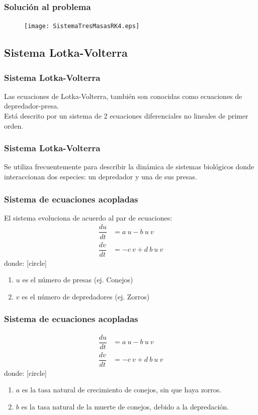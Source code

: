 \begin{frame}[plain]
\frametitle{Solución al problema}
\begin{figure}
    \centering
    \texttt{[image: SistemaTresMasasRK4.eps]} 
\end{figure}
\end{frame}
\subsection{Sistema Lotka-Volterra}
\begin{frame}
\frametitle{Sistema Lotka-Volterra}
Las ecuaciones de Lotka-Volterra, también son conocidas como ecuaciones de depredador-presa.
\\
\bigskip
Está descrito por un sistema de 2 ecuaciones diferenciales no lineales de primer orden.
\end{frame}
\begin{frame}
\frametitle{Sistema Lotka-Volterra}
Se utiliza frecuentemente para describir la dinámica de sistemas biológicos donde interaccionan dos especies: un depredador y una de sus presas.
\end{frame}
\begin{frame}
\frametitle{Sistema de ecuaciones acopladas}
El sistema evoluciona de acuerdo al par de ecuaciones:
\begin{align*}
\dfrac{du}{dt} &= a \: u - b \: u \: v \\
\dfrac{dv}{dt} &= -c \: v + d \: b\: u\: v
\end{align*}
donde:  
[circle]
\begin{enumerate}[<+->]
\item $u$ es el número de presas (ej. Conejos)
\item $v$ es el número de depredadores (ej. Zorros)
\seti
\end{enumerate}
\end{frame}
\begin{frame}
\frametitle{Sistema de ecuaciones acopladas}
\begin{align*}
\dfrac{du}{dt} &= a \: u - b \: u \: v \\
\dfrac{dv}{dt} &= -c \: v + d \: b\: u\: v
\end{align*}
donde:
[circle]
\begin{enumerate}[<+->]
\conti
\item $a$ es la tasa natural de crecimiento de conejos, sin que haya zorros.
\item $b$ es la tasa natural de la muerte de conejos, debido a la depredación.
\seti
\end{enumerate}
\end{frame}
